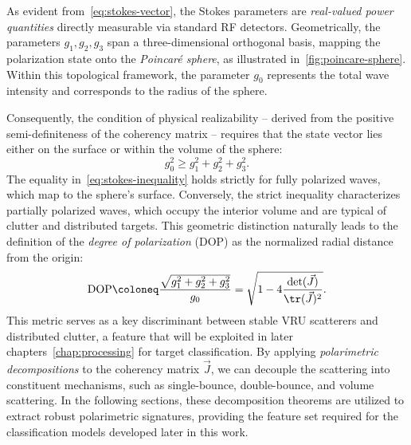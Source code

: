As evident from~\cref{eq:stokes-vector}, the Stokes parameters are \emph{real-valued power quantities} directly measurable via standard RF detectors.
Geometrically, the parameters $g_1, g_2, g_3$ span a three-dimensional orthogonal basis, mapping the polarization state onto the \emph{Poincaré sphere}, as illustrated in~\cref{fig:poincare-sphere}.
Within this topological framework, the parameter $g_0$ represents the total wave intensity and corresponds to the radius of the sphere.

Consequently, the condition of physical realizability -- derived from the positive semi-definiteness of the coherency matrix -- requires that the state vector lies either on the surface or within the volume of the sphere:
\begin{equation}
    \label{eq:stokes-inequality}
    g_0^2 \geq g_1^2 + g_2^2 + g_3^2.
\end{equation}
The equality in~\cref{eq:stokes-inequality} holds strictly for fully polarized waves, which map to the sphere's surface.
Conversely, the strict inequality characterizes partially polarized waves, which occupy the interior volume and are typical of clutter and distributed targets.
This geometric distinction naturally leads to the definition of the \emph{degree of polarization} (DOP) as the normalized radial distance from the origin:
\begin{align}
    \text{DOP} \coloneq \frac{\sqrt{g_1^2 + g_2^2 + g_3^2}}{g_0} = \sqrt{1-4\frac{\det(\vec J)}{\tr(\vec J)^2}}.
\end{align}
This metric serves as a key discriminant between stable VRU scatterers and distributed clutter, a feature that will be exploited in later chapters~\cref{chap:processing} for target classification.
By applying \emph{polarimetric decompositions} to the coherency matrix $\vec J$, we can decouple the scattering into constituent mechanisms, such as single-bounce, double-bounce, and volume scattering.
In the following sections, these decomposition theorems are utilized to extract robust polarimetric signatures, providing the feature set required for the classification models developed later in this work.


